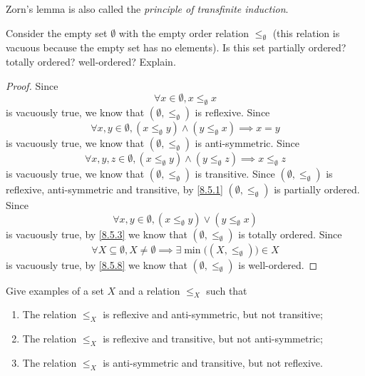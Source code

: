 \begin{note}
  Zorn's lemma is also called the \emph{principle of transfinite induction}.
\end{note}

\exercisesection

\begin{ex}\label{ex:8.5.1}
  Consider the empty set \(\emptyset\) with the empty order relation \(\leq_\emptyset\)
  (this relation is vacuous because the empty set has no elements).
  Is this set partially ordered? totally ordered? well-ordered? Explain.
\end{ex}

\begin{proof}
  Since
  \[
    \forall x \in \emptyset, x \leq_{\emptyset} x
  \]
  is vacuously true, we know that \((\emptyset, \leq_{\emptyset})\) is reflexive.
  Since
  \[
    \forall x, y \in \emptyset, (x \leq_{\emptyset} y) \land (y \leq_{\emptyset} x) \implies x = y
  \]
  is vacuously true, we know that \((\emptyset, \leq_{\emptyset})\) is anti-symmetric.
  Since
  \[
    \forall x, y, z \in \emptyset, (x \leq_{\emptyset} y) \land (y \leq_{\emptyset} z) \implies x \leq_{\emptyset} z
  \]
  is vacuously true, we know that \((\emptyset, \leq_{\emptyset})\) is transitive.
  Since \((\emptyset, \leq_{\emptyset})\) is reflexive, anti-symmetric and transitive, by \cref{8.5.1} \((\emptyset, \leq_{\emptyset})\) is partially ordered.
  Since
  \[
    \forall x, y \in \emptyset, (x \leq_{\emptyset} y) \lor (y \leq_{\emptyset} x)
  \]
  is vacuously true, by \cref{8.5.3} we know that \((\emptyset, \leq_{\emptyset})\) is totally ordered.
  Since
  \[
    \forall X \subseteq \emptyset, X \neq \emptyset \implies \exists \min\big((X, \leq_{\emptyset})\big) \in X
  \]
  is vacuously true, by \cref{8.5.8} we know that \((\emptyset, \leq_{\emptyset})\) is well-ordered.
\end{proof}

\begin{ex}\label{ex:8.5.2}
  Give examples of a set \(X\) and a relation \(\leq_X\) such that
  \begin{enumerate}
    \item The relation \(\leq_X\) is reflexive and anti-symmetric, but not transitive;
    \item The relation \(\leq_X\) is reflexive and transitive, but not anti-symmetric;
    \item The relation \(\leq_X\) is anti-symmetric and transitive, but not reflexive.
  \end{enumerate}
\end{ex}

